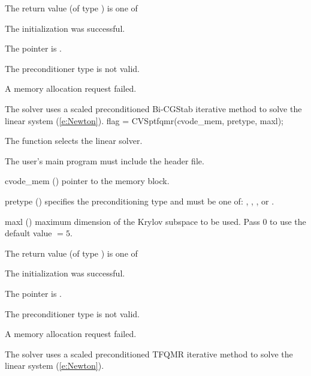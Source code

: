 {
  The return value  (of type ) is one of
  \begin{args}
  \item[\Id{CVSPILS\_SUCCESS}] 
    The {\cvspbcg} initialization was successful.
  \item[\Id{CVSPILS\_MEM\_NULL}]
    The  pointer is .
  \item[\Id{CVSPILS\_ILL\_INPUT}]
    The preconditioner type  is not valid.
  \item[\Id{CVSPILS\_MEM\_FAIL}]
    A memory allocation request failed.
  \end{args}
}
{
  The {\cvspbcg} solver uses a scaled preconditioned Bi-CGStab
  iterative method to solve the linear system (\ref{e:Newton}).
}
{
  flag = CVSptfqmr(cvode\_mem, pretype, maxl);
}
{
  The function  selects the {\cvsptfqmr} linear solver. 

  The user's main program must include the  header file.
}
{
  \begin{args}
  \item[cvode\_mem] ()
    pointer to the {\cvodes} memory block.
  \item[pretype] ()
    specifies the preconditioning type and must be one of: 
    , , , or .
  \item[maxl] ()
    maximum dimension of the Krylov subspace to be used. Pass $0$ to use the 
    default value  $= 5$.
  \end{args}
}
{
  The return value  (of type ) is one of
  \begin{args}
  \item[\Id{CVSPILS\_SUCCESS}] 
    The {\cvsptfqmr} initialization was successful.
  \item[\Id{CVSPILS\_MEM\_NULL}]
    The  pointer is .
  \item[\Id{CVSPILS\_ILL\_INPUT}]
    The preconditioner type  is not valid.
  \item[\Id{CVSPILS\_MEM\_FAIL}]
    A memory allocation request failed.
  \end{args}
}
{
  The {\cvsptfqmr} solver uses a scaled preconditioned TFQMR
  iterative method to solve the linear system (\ref{e:Newton}).
}



